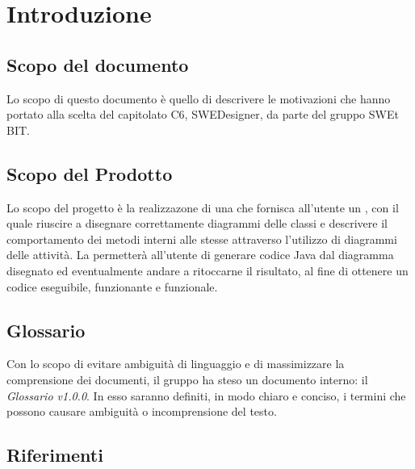 \section{Introduzione}
  \subsection{Scopo del documento}
          Lo scopo di questo documento è quello di descrivere le motivazioni che hanno portato alla scelta del capitolato C6, SWEDesigner, da parte del gruppo SWEt BIT.
  \subsection{Scopo del Prodotto}
          Lo scopo del progetto è la realizzazone di una  che fornisca all'utente un  , con il quale riuscire a disegnare correttamente diagrammi delle classi
          e descrivere il comportamento dei metodi interni alle stesse attraverso l'utilizzo di diagrammi delle attività.
          La  permetterà all'utente di generare codice Java dal diagramma disegnato ed eventualmente andare a ritoccarne il risultato, al fine di ottenere un codice
          eseguibile, funzionante e funzionale.
  \subsection{Glossario}
          Con lo scopo di evitare ambiguità di linguaggio e di massimizzare la comprensione dei documenti, il
          gruppo ha steso un documento interno: il \emph{Glossario v1.0.0}. In esso saranno definiti, in modo
          chiaro e conciso, i termini che possono causare ambiguità o incomprensione del testo.
  \subsection{Riferimenti}
